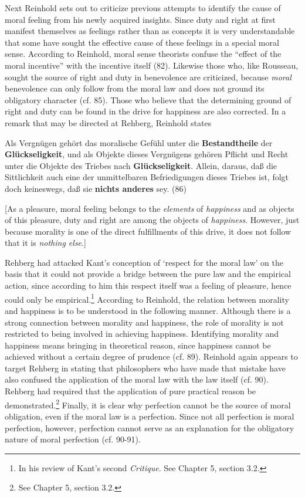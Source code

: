Next Reinhold sets out to criticize previous attempts to identify the cause of moral feeling from his newly acquired insights. Since duty and right at first manifest themselves as feelings rather than as concepts it is very understandable that some have sought the effective cause of these feelings in a special moral sense. According to Reinhold, moral sense theorists confuse the ``effect of the moral incentive'' with the incentive itself (82). Likewise those who, like Rousseau, sought the source of right and duty in benevolence are criticized, because \textit{moral} benevolence can only follow from the moral law and does not ground its obligatory character (cf. 85). Those who believe that the determining ground of right and duty can be found in the drive for happiness are also corrected. In a remark that may be directed at Rehberg, Reinhold states

Als Vergn\"{u}gen geh\"{o}rt das moralische Gef\"{u}hl unter die \textbf{Bestandtheile} der \textbf{Gl\"{u}ckseligkeit}, und als Objekte dieses Vergn\"{u}gens geh\"{o}ren Pflicht und Recht unter die Objekte des Triebes nach \textbf{Gl\"{u}ckseligkeit}. Allein, daraus, da\ss{} die Sittlichkeit auch eine der unmittelbaren Befriedigungen dieses Triebes ist, folgt doch keineswegs, da\ss{} sie \textbf{nichts anderes} sey. (86)

[As a pleasure, moral feeling belongs to the \textit{elements} of \textit{happiness} and as objects of this pleasure, duty and right are among the objects of \textit{happiness}. However, just because morality is one of the direct fulfillments of this drive, it does not follow that it is \textit{nothing else}.]

Rehberg had attacked Kant's conception of `respect for the moral law' on the basis that it could not provide a bridge between the pure law and the empirical action, since according to him this respect itself was a feeling of pleasure, hence could only be empirical.\footnote{ In his review of Kant's second \textit{Critique}. See Chapter 5, section 3.2. } According to Reinhold, the relation between morality and happiness is to be understood in the following manner. Although there is a strong connection between morality and happiness, the role of morality is not restricted to being involved in achieving happiness. Identifying morality and happiness means bringing in theoretical reason, since happiness cannot be achieved without a certain degree of prudence (cf. 89). Reinhold again appears to target Rehberg in stating that philosophers who have made that mistake have also confused the application of the moral law with the law itself (cf. 90). Rehberg had required that the application of pure practical reason be demonstrated.\footnote{ See Chapter 5, section 3.2. } Finally, it is clear why perfection cannot be the source of moral obligation, even if the moral law is a perfection. Since not all perfection is moral perfection, however, perfection cannot serve as an explanation for the obligatory nature of moral perfection (cf. 90{-}91). 


